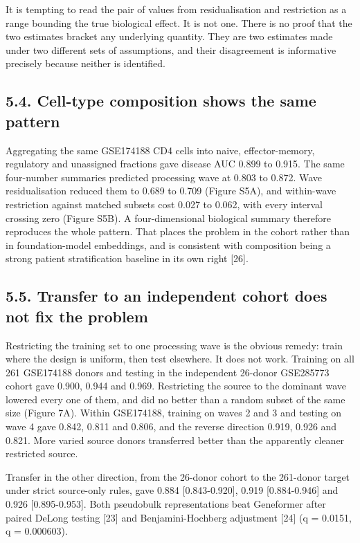 It is tempting to read the pair of values from residualisation and restriction as a range bounding the true biological effect. It is not one. There is no proof that the two estimates bracket any underlying quantity. They are two estimates made under two different sets of assumptions, and their disagreement is informative precisely because neither is identified.

\subsection{5.4. Cell-type composition shows the same pattern}\label{cell-type-composition-shows-the-same-pattern}

Aggregating the same GSE174188 CD4 cells into naive, effector-memory, regulatory and unassigned fractions gave disease AUC 0.899 to 0.915. The same four-number summaries predicted processing wave at 0.803 to 0.872. Wave residualisation reduced them to 0.689 to 0.709 (Figure S5A), and within-wave restriction against matched subsets cost 0.027 to 0.062, with every interval crossing zero (Figure S5B). A four-dimensional biological summary therefore reproduces the whole pattern. That places the problem in the cohort rather than in foundation-model embeddings, and is consistent with composition being a strong patient stratification baseline in its own right {[}26{]}.

\subsection{5.5. Transfer to an independent cohort does not fix the problem}\label{transfer-to-an-independent-cohort-does-not-fix-the-problem}

Restricting the training set to one processing wave is the obvious remedy: train where the design is uniform, then test elsewhere. It does not work. Training on all 261 GSE174188 donors and testing in the independent 26-donor GSE285773 cohort gave 0.900, 0.944 and 0.969. Restricting the source to the dominant wave lowered every one of them, and did no better than a random subset of the same size (Figure 7A). Within GSE174188, training on waves 2 and 3 and testing on wave 4 gave 0.842, 0.811 and 0.806, and the reverse direction 0.919, 0.926 and 0.821. More varied source donors transferred better than the apparently cleaner restricted source.

Transfer in the other direction, from the 26-donor cohort to the 261-donor target under strict source-only rules, gave 0.884 {[}0.843-0.920{]}, 0.919 {[}0.884-0.946{]} and 0.926 {[}0.895-0.953{]}. Both pseudobulk representations beat Geneformer after paired DeLong testing {[}23{]} and Benjamini-Hochberg adjustment {[}24{]} (q = 0.0151, q = 0.000603).

